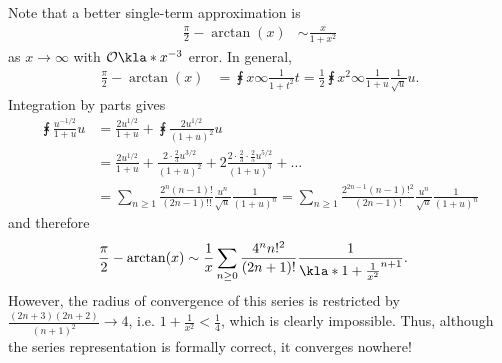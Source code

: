 \documentclass[english, parskip=full]{scrartcl}
\begin{document}
Note that a better single-term approximation is
\begin{align}
\frac{\pi}{2} - \arctan(x) &\sim \frac{x}{1+x^2}
\end{align}
as $x\rightarrow\infty$ with $\mathcal{O}\kla*{x^{-3}}$ error.
In general,
\begin{align}
\frac{\pi}{2} - \arctan(x) &= \intx{x}{\infty}{\frac{1}{1+t^2}}{t} = \frac{1}{2}\intx{x^2}{\infty}{\frac{1}{1+u} \frac{1}{\sqrt{u}}}{u}.
\end{align}
Integration by parts gives
\begin{align}
\intx{ }{ }{\frac{u^{-1/2}}{1+u}}{u} &= \frac{2u^{1/2}}{1+u} + \intx{ }{ }{\frac{2u^{1/2}}{(1+u)^2}}{u}\\
&= \frac{2u^{1/2}}{1+u} + \frac{2 \cdot \frac{2}{3} u^{3/2}}{(1+u)^2} + 2\frac{2\cdot \frac{2}{3} \cdot \frac{2}{5} u^{5/2}}{(1+u)^3} + \dots\\
&= \sum_{n\ge 1} \frac{2^n (n-1)!}{(2n-1)!!} \frac{u^n}{\sqrt{u}} \frac{1}{(1+u)^n} = \sum_{n\ge 1} \frac{2^{2n-1} (n-1)!^2}{(2n-1)!} \frac{u^n}{\sqrt{u}} \frac{1}{(1+u)^n}
\end{align}
and therefore
\begin{align}
\frac{\pi}{2}-\arctan(x) &\sim \frac{1}{x} \sum_{n\ge 0} \frac{4^{n} n!^2}{(2n+1)!} \frac{1}{\kla*{1 + \frac{1}{x^2}}^{n+1}}.
\end{align}
However, the radius of convergence of this series is restricted by $\frac{(2n+3)(2n+2)}{(n+1)^2} \rightarrow 4$, i.e. $1+\frac{1}{x^2} < \frac{1}{4}$, which is clearly impossible.
Thus, although the series representation is formally correct, it converges nowhere!
\end{document}
